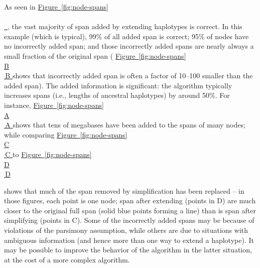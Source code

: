\documentclass[10pt,twoside,lineno]{gsajnl}
\newcommand*{\figref}[2][]{%
	\hyperref[{#2}]{%
		Figure~\ref*{#2}%
		\ifx\\#1\\%
		\else
		\,#1%
		\fi
	}%
}
\begin{document}
%
%

As seen in \figref{fig:node-spans},
the vast majority of span added by extending haplotypes is correct.
In this example (which is typical),
99\% of all added span is correct;
95\% of nodes have no incorrectly added span; 
and those incorrectly added spans are nearly always a small fraction of the original span
(\figref[B]{fig:node-spans} shows that incorrectly added span is often a factor of
10--100 smaller than the added span).
The added information is significant:
the algorithm typically increases spans (i.e., lengths of ancestral haplotypes)
by around 50\%.
For instance, \figref[A]{fig:node-spans} 
shows that tens of megabases have been added to the spans of many nodes;
while comparing \figref[C]{fig:node-spans} to \figref[D]{fig:node-spans} 
shows that much of the span removed by simplification has been replaced --
in those figures, each point is one node;
span after extending (points in D) are much closer to the original full span
(solid blue points forming a line)
than is span after simplifying (points in C).
Some of the incorrectly added spans may be because of violations of the parsimony assumption,
while others are due to situations with ambiguous information
(and hence more than one way to extend a haplotype).
It may be possible to improve the behavior of the algorithm in the latter situation,
at the cost of a more complex algorithm. 
\end{document}

